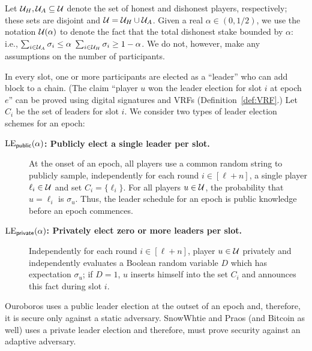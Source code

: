 Let $\mathcal{U}_H, \mathcal{U}_A \subseteq \mathcal{U}$ 
denote the set of honest and dishonest players, respectively;
these sets are disjoint and $\mathcal{U} = \mathcal{U}_H \cup \mathcal{U}_A$.
Given a real $\alpha \in (0,1/2)$, 
we use the notation $\mathcal{U}(\alpha)$ 
to denote the fact that the total dishonest stake bounded by $\alpha$: i.e., 
$\sum_{i \in \mathcal{U}_A} \sigma_i \leq \alpha$
$\sum_{i \in \mathcal{U}_H} \sigma_i \geq 1 - \alpha$. 
We do not, however, make any assumptions on the number of participants.


In every slot, 
one or more participants are elected as a ``leader'' who can add block to a chain. 
(The claim ``player $u$ won the leader election for slot $i$ at epoch $e$'' 
can be proved using digital signatures and VRFs (Definition~\ref{def:VRF}.)
Let $C_i$ be the set of leaders for slot $i$. 
We consider two types of leader election schemes for an epoch: 
\begin{description}
    \item[\textbf{$\mathrm{LE}_\mathsf{public}(\alpha)$: Publicly elect a single leader per slot.}] \label{lottery:public}
    At the onset of an epoch, 
    all players use a common random string to 
    publicly sample, 
    independently for each round $i \in [\ell + n]$, 
    a single player $\ell_i \in \mathcal{U}$ and  
    set $C_i = \{\ell_i\}$. 
    For all players $u \in \mathcal{U}$, 
    the probability that $u = \ell_i$ is $\sigma_u$. 
    Thus, the leader schedule for an epoch 
    is public knowledge before an epoch commences. 

    \item[\textbf{$\mathrm{LE}_\mathsf{private}(\alpha)$: Privately elect zero or more leaders per slot.}] \label{lottery:private}
    Independently for each round $i \in [\ell + n]$, 
    player $u \in \mathcal{U}$ 
    privately and independently 
    evaluates a Boolean random variable $D$
    which has expectation $\sigma_u$; 
    if $D = 1$, $u$ 
    inserts himself into the set $C_i$ 
    and announces this fact during slot $i$. 
\end{description}
\noindent
Ouroboros uses a public leader election 
at the outset of an epoch 
and, therefore, it is secure only against a static adversary. 
SnowWhtie and Praos (and Bitcoin as well) uses a private leader election 
and therefore, must prove security against an adaptive adversary. 


